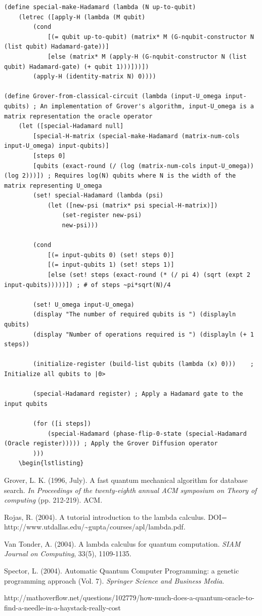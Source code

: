 \documentclass[11pt]{article}
\begin{document}
\begin{appendices}
\begin{lstlisting}
(define special-make-Hadamard (lambda (N up-to-qubit)
	(letrec ([apply-H (lambda (M qubit)
		(cond
			[(= qubit up-to-qubit) (matrix* M (G-nqubit-constructor N (list qubit) Hadamard-gate))]
			[else (matrix* M (apply-H (G-nqubit-constructor N (list qubit) Hadamard-gate) (+ qubit 1)))]))])
		(apply-H (identity-matrix N) 0))))

(define Grover-from-classical-circuit (lambda (input-U_omega input-qubits) ; An implementation of Grover's algorithm, input-U_omega is a matrix representation the oracle operator
	(let ([special-Hadamard null]
		[special-H-matrix (special-make-Hadamard (matrix-num-cols input-U_omega) input-qubits)] 
		[steps 0] 
		[qubits (exact-round (/ (log (matrix-num-cols input-U_omega)) (log 2)))]) ; Requires log(N) qubits where N is the width of the matrix representing U_omega
		(set! special-Hadamard (lambda (psi)
			(let ([new-psi (matrix* psi special-H-matrix)])
				(set-register new-psi)
				new-psi)))

		(cond
			[(= input-qubits 0) (set! steps 0)]
			[(= input-qubits 1) (set! steps 1)]
			[else (set! steps (exact-round (* (/ pi 4) (sqrt (expt 2 input-qubits)))))]) ; # of steps ~pi*sqrt(N)/4

		(set! U_omega input-U_omega)
		(display "The number of required qubits is ") (displayln qubits)
		(display "Number of operations required is ") (displayln (+ 1 steps))

		(initialize-register (build-list qubits (lambda (x) 0)))	; Initialize all qubits to |0>

		(special-Hadamard register)	; Apply a Hadamard gate to the input qubits

		(for ([i steps])
			(special-Hadamard (phase-flip-0-state (special-Hadamard (Oracle register))))) ; Apply the Grover Diffusion operator
		)))
	\begin{lstlisting}
	\end{lstlisting}
\end{appendices}

\begin{thebibliography}{9}

	Grover, L. K. (1996, July). A fast quantum mechanical algorithm for database search. \emph{In Proceedings of the twenty-eighth annual ACM symposium on Theory of computing} (pp. 212-219). ACM.
  
  Rojas, R. (2004). A tutorial introduction to the lambda calculus. DOI= http://www.utdallas.edu/\textasciitilde gupta/courses/apl/lambda.pdf.
  
  Van Tonder, A. (2004). A lambda calculus for quantum computation. \emph{SIAM Journal on Computing}, 33(5), 1109-1135.
  
  Spector, L. (2004). Automatic Quantum Computer Programming: a genetic programming approach (Vol. 7). \emph{Springer Science and Business Media}.
  
  http://mathoverflow.net/questions/102779/how-much-does-a-quantum-oracle-to-find-a-needle-in-a-haystack-really-cost

\end{thebibliography}
\end{document}
